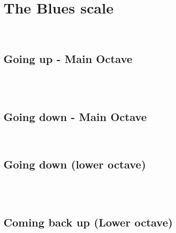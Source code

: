 \section{The Blues scale}\\

\subsection{Going up - Main Octave}\\
\2\3\four\e\4\5\6\\

\subsection{Going down - Main Octave}\\
\6\5\4\e\four\3\2

\subsection{Going down (lower octave)}\\
\2\w\1\odb\one\\
\subsection{Coming back up (Lower octave)}\\
\one\odb\1\w\2\\